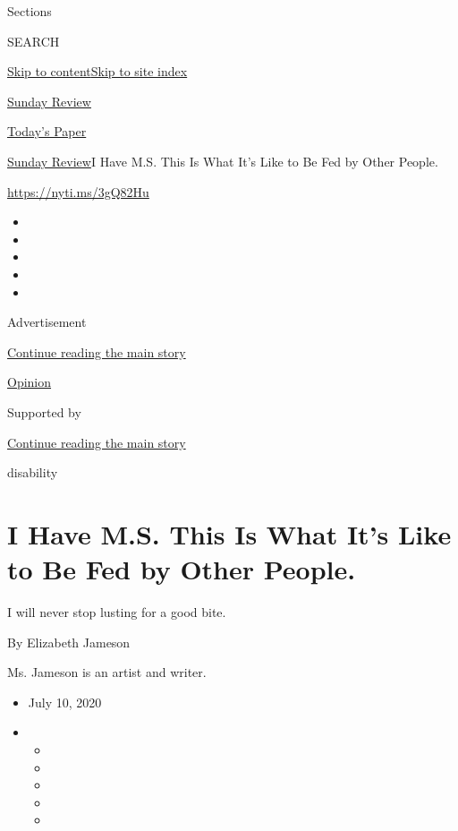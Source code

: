 Sections

SEARCH

\protect\hyperlink{site-content}{Skip to
content}\protect\hyperlink{site-index}{Skip to site index}

\href{https://www.nytimes3xbfgragh.onion/section/opinion/sunday}{Sunday
Review}

\href{https://myaccount.nytimes3xbfgragh.onion/auth/login?response_type=cookie\&client_id=vi}{}

\href{https://www.nytimes3xbfgragh.onion/section/todayspaper}{Today's
Paper}

\href{/section/opinion/sunday}{Sunday Review}\textbar{}I Have M.S. This
Is What It's Like to Be Fed by Other People.

\url{https://nyti.ms/3gQ82Hu}

\begin{itemize}
\item
\item
\item
\item
\item
\end{itemize}

Advertisement

\protect\hyperlink{after-top}{Continue reading the main story}

\href{/section/opinion}{Opinion}

Supported by

\protect\hyperlink{after-sponsor}{Continue reading the main story}

disability

\hypertarget{i-have-ms-this-is-what-its-like-to-be-fed-by-other-people}{%
\section{I Have M.S. This Is What It's Like to Be Fed by Other
People.}\label{i-have-ms-this-is-what-its-like-to-be-fed-by-other-people}}

I will never stop lusting for a good bite.

By Elizabeth Jameson

Ms. Jameson is an artist and writer.

\begin{itemize}
\item
  July 10, 2020
\item
  \begin{itemize}
  \item
  \item
  \item
  \item
  \item
  \end{itemize}
\end{itemize}

